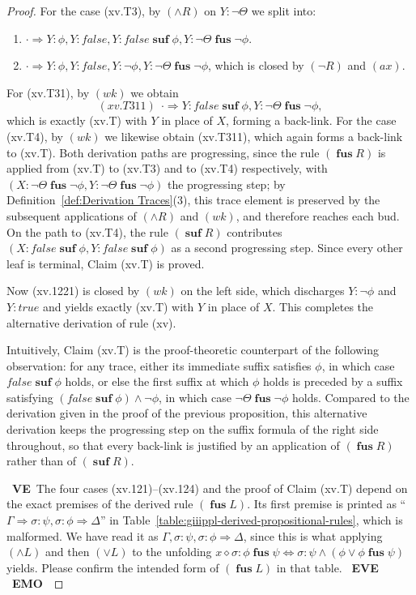 \documentclass[manuscript,screen]{acmart}
\newcommand{\true}[0]{\mathit{true}}
\newcommand{\false}[0]{\mathit{false}}
\newcommand{\cat}[0]{\diamond}
\DeclareMathOperator{\osuf}{\mathbf{suf}}
\DeclareMathOperator{\ofus}{\mathbf{fus}}
\newcommand{\A}[1]{\mbox{ \textbf{#1} }}
\newcommand{\EMO}{\A{EMO}}
\newcommand{\VE}{\A{VE}}
\newcommand{\EVE}{\A{EVE}}
\begin{document}
\begin{proof}
For the case (xv.T3), by $(\wedge R)$ on $Y : \neg\Theta$ we split into: 
\begin{enumerate}
    \item[(xv.T31)] $\cdot\Rightarrow Y : \phi, Y : \false, Y : \false\osuf\phi, Y : \neg\Theta\ofus \neg\phi$. 
    \item[(xv.T32)] $\cdot\Rightarrow Y : \phi, Y : \false, Y : \neg\phi, Y : \neg\Theta\ofus \neg\phi$, which is closed by $(\neg R)$ and $(ax)$. 
\end{enumerate}
For (xv.T31), by $(wk)$ we obtain
$$
(xv.T311)\ \ \cdot\Rightarrow Y : \false\osuf\phi, Y : \neg\Theta\ofus \neg\phi, 
$$
which is exactly (xv.T) with $Y$ in place of $X$, forming a back-link. 
For the case (xv.T4), by $(wk)$ we likewise obtain (xv.T311), which again forms a back-link to (xv.T). 
Both derivation paths are progressing, since the rule $(\ofus R)$ is applied from (xv.T) to (xv.T3) and to (xv.T4) respectively, with $(X : \neg\Theta\ofus \neg\phi, Y : \neg\Theta\ofus \neg\phi)$ the progressing step; 
by Definition~\ref{def:Derivation Traces}(3), this trace element is preserved by the subsequent applications of $(\wedge R)$ and $(wk)$, and therefore reaches each bud. 
On the path to (xv.T4), the rule $(\osuf R)$ contributes $(X : \false\osuf\phi, Y : \false\osuf\phi)$ as a second progressing step. 
Since every other leaf is terminal, Claim (xv.T) is proved. 

Now (xv.1221) is closed by $(wk)$ on the left side, which discharges $Y : \neg\phi$ and $Y : \true$ and yields exactly (xv.T) with $Y$ in place of $X$. 
This completes the alternative derivation of rule (xv). 

Intuitively, Claim (xv.T) is the proof-theoretic counterpart of the following observation: for any trace, either its immediate suffix satisfies $\phi$, in which case $\false\osuf\phi$ holds, or else the first suffix at which $\phi$ holds is preceded by a suffix satisfying $(\false\osuf\phi)\wedge \neg\phi$, in which case $\neg\Theta\ofus \neg\phi$ holds. 
Compared to the derivation given in the proof of the previous proposition, this alternative derivation keeps the progressing step on the suffix formula of the right side throughout, so that every back-link is justified by an application of $(\ofus R)$ rather than of $(\osuf R)$. 

\VE The four cases (xv.121)--(xv.124) and the proof of Claim (xv.T) depend on the exact premises of the derived rule $(\ofus L)$. Its first premise is printed as ``$\Gamma\Rightarrow \sigma : \psi, \sigma : \phi\Rightarrow \Delta$'' in Table~\ref{table:giiippl-derived-propositional-rules}, which is malformed. We have read it as $\Gamma, \sigma : \psi, \sigma : \phi\Rightarrow \Delta$, since this is what applying $(\wedge L)$ and then $(\vee L)$ to the unfolding $x\cat\sigma : \phi\ofus\psi\Leftrightarrow \sigma : \psi\wedge(\phi\vee \phi\ofus\psi)$ yields. Please confirm the intended form of $(\ofus L)$ in that table. \EVE
\EMO
\fi
\end{proof}
\end{document}
